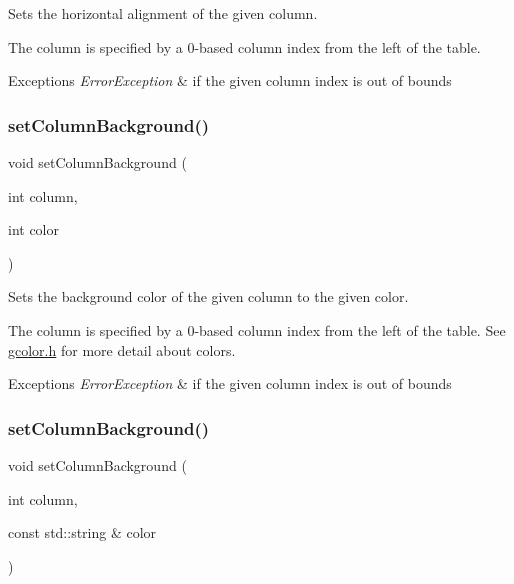 Sets the horizontal alignment of the given column. 

The column is specified by a 0-\/based column index from the left of the table. 
\begin{DoxyExceptions}{Exceptions}
{\em Error\+Exception} & if the given column index is out of bounds \\
\hline
\end{DoxyExceptions}
\mbox{\label{classsgl_1_1GTable_a48898e733d8ae3e285ff84d02e2cdee5}} 
\subsubsection{\texorpdfstring{set\+Column\+Background()}{setColumnBackground()}\hspace{0.1cm}{\footnotesize\ttfamily [1/2]}}
{\footnotesize\ttfamily void set\+Column\+Background (\begin{DoxyParamCaption}\item[{int}]{column,  }\item[{int}]{color }\end{DoxyParamCaption})\hspace{0.3cm}{\ttfamily [virtual]}}



Sets the background color of the given column to the given color. 

The column is specified by a 0-\/based column index from the left of the table. See \mbox{\hyperlink{gcolor_8h_source}{gcolor.\+h}} for more detail about colors. 
\begin{DoxyExceptions}{Exceptions}
{\em Error\+Exception} & if the given column index is out of bounds \\
\hline
\end{DoxyExceptions}
\mbox{\label{classsgl_1_1GTable_a37fd3b921a5fba28b84dd4dd17fa9930}} 
\subsubsection{\texorpdfstring{set\+Column\+Background()}{setColumnBackground()}\hspace{0.1cm}{\footnotesize\ttfamily [2/2]}}
{\footnotesize\ttfamily void set\+Column\+Background (\begin{DoxyParamCaption}\item[{int}]{column,  }\item[{const std\+::string \&}]{color }\end{DoxyParamCaption})\hspace{0.3cm}{\ttfamily [virtual]}}




